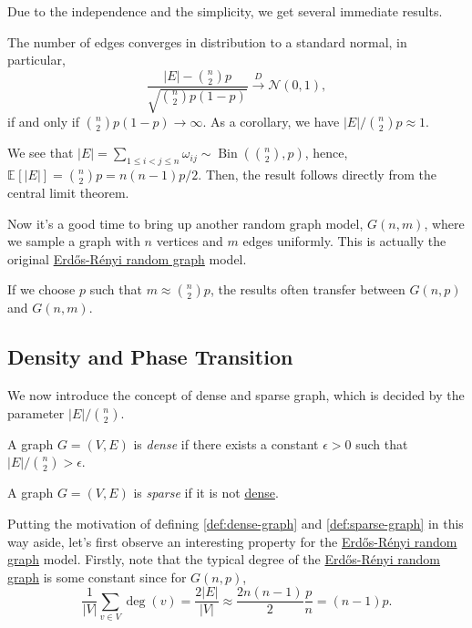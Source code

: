 Due to the independence and the simplicity, we get several immediate results.

\begin{claim}
	The number of edges converges in distribution to a standard normal, in particular,
	\[
		\frac{\lvert E \rvert - \binom{n}{2}p}{\sqrt{\binom{n}{2}p (1 - p)} }
		\overset{D}{\to } \mathcal{N} (0, 1),
	\]
	if and only if \(\binom{n}{2}p (1 - p) \to \infty \). As a corollary, we have \(\lvert E \rvert / \binom{n}{2}p \approx 1\).
\end{claim}
\begin{explanation}
	We see that \(\lvert E \rvert = \sum_{1 \leq i < j \leq n} \omega _{ij} \sim \operatorname{Bin}(\binom{n}{2}, p) \), hence, \(\mathbb{E}_{}[\lvert E \rvert ] = \binom{n}{2}p = n(n-1) p / 2\). Then, the result follows directly from the central limit theorem.
\end{explanation}

Now it's a good time to bring up another random graph model, \(G(n, m)\), where we sample a graph with \(n\) vertices and \(m\) edges uniformly. This is actually the original \hyperref[def:Erdős-Rényi-random-graph]{Erdős-Rényi random graph} model.

\begin{remark}
	If we choose \(p\) such that \(m \approx \binom{n}{2}p\), the results often transfer between \(G(n, p)\) and \(G(n, m)\).
\end{remark}

\subsection{Density and Phase Transition}
We now introduce the concept of dense and sparse graph, which is decided by the parameter \(\lvert E \rvert / \binom{n}{2} \).

\begin{definition}\label{def:dense-graph}
	A graph \(G = (V, E)\) is \emph{dense} if there exists a constant \(\epsilon > 0\) such that \(\lvert E \rvert / \binom{n}{2} > \epsilon \).
\end{definition}

\begin{definition}\label{def:sparse-graph}
	A graph \(G = (V, E)\) is \emph{sparse} if it is not \hyperref[def:dense-graph]{dense}.
\end{definition}

Putting the motivation of defining \autoref{def:dense-graph} and \autoref{def:sparse-graph} in this way aside, let's first observe an interesting property for the \hyperref[def:Erdős-Rényi-random-graph]{Erdős-Rényi random graph} model. Firstly, note that the typical degree of the \hyperref[def:Erdős-Rényi-random-graph]{Erdős-Rényi random graph} is some constant since for \(G(n, p)\),
\[
	\frac{1}{\lvert V \rvert } \sum_{v \in V} \deg (v)
	= \frac{2 \lvert E \rvert }{\lvert V \rvert }
	\approx \frac{2 n (n-1)}{2} \frac{p}{n}
	= (n-1) p.
\]

